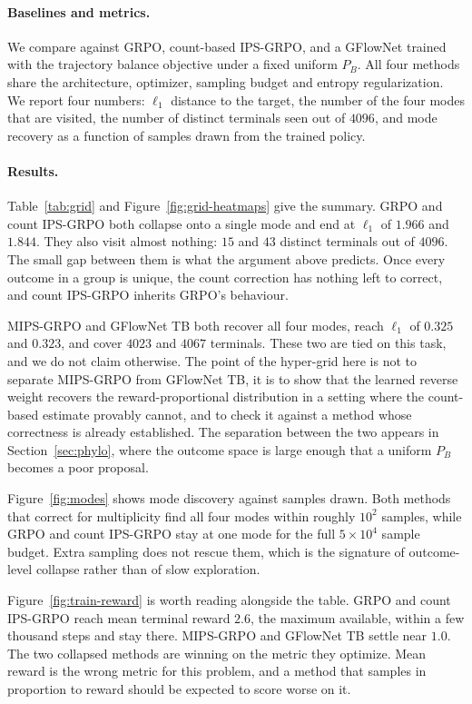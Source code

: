 \documentclass[11pt]{article}
\begin{document}
\paragraph{Baselines and metrics.}
We compare against GRPO, count-based IPS-GRPO, and a GFlowNet trained with the
trajectory balance objective under a fixed uniform $P_B$. All four methods share
the architecture, optimizer, sampling budget and entropy regularization. We
report four numbers: $\ell_1$ distance to the target, the number of the four
modes that are visited, the number of distinct terminals seen out of $4096$, and
mode recovery as a function of samples drawn from the trained policy.

\paragraph{Results.}
Table~\ref{tab:grid} and Figure~\ref{fig:grid-heatmaps} give the summary. GRPO
and count IPS-GRPO both collapse onto a single mode and end at $\ell_1$ of
$1.966$ and $1.844$. They also visit almost nothing: $15$ and $43$ distinct
terminals out of $4096$. The small gap between them is what the argument above
predicts. Once every outcome in a group is unique, the count correction has
nothing left to correct, and count IPS-GRPO inherits GRPO's behaviour.

MIPS-GRPO and GFlowNet TB both recover all four modes, reach $\ell_1$
of $0.325$ and $0.323$, and cover $4023$ and $4067$ terminals. These two are
tied on this task, and we do not claim otherwise. The point of the hyper-grid
here is not to separate MIPS-GRPO from GFlowNet TB, it is to show that
the learned reverse weight recovers the reward-proportional distribution in a
setting where the count-based estimate provably cannot, and to check it against
a method whose correctness is already established. The separation between the
two appears in Section~\ref{sec:phylo}, where the outcome space is large enough
that a uniform $P_B$ becomes a poor proposal.

Figure~\ref{fig:modes} shows mode discovery against samples drawn. Both
methods that correct for multiplicity find all four modes within roughly $10^2$ samples,
while GRPO and count IPS-GRPO stay at one mode for the full $5\times10^4$
sample budget. Extra sampling does not rescue them, which is the signature of
outcome-level collapse rather than of slow exploration.

Figure~\ref{fig:train-reward} is worth reading alongside the table. GRPO and
count IPS-GRPO reach mean terminal reward $2.6$, the maximum available, within a
few thousand steps and stay there. MIPS-GRPO and GFlowNet TB settle
near $1.0$. The two collapsed methods are winning on the metric they optimize.
Mean reward is the wrong metric for this problem, and a method that samples in
proportion to reward should be expected to score worse on it.
\end{document}
